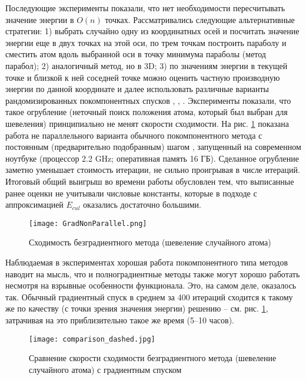   Последующие эксперименты показали, что нет необходимости пересчитывать значение энергии в ${O}\left( n \right)$ точках. Рассматривались следующие альтернативные стратегии: 1) выбрать случайно одну из координатных осей и посчитать значение энергии еще в двух точках на этой оси, по трем точкам построить параболу и сместить атом вдоль выбранной оси в точку минимума параболы (метод парабол); 2) аналогичный метод, но в 3D; 3) по значениям энергии в текущей точке и близкой к ней соседней точке можно оценить частную производную энергии по данной координате и далее использовать различные варианты рандомизированных покомпонентных спусков 
  \cite{conn2009introduction},
  \cite{ghadimi2013stochastic}, \cite{wright2015coordinate}.
  Эксперименты показали, что такое огрубление (неточный поиск положения атома, который был выбран для шевеления) принципиально не менят скорости сходимости. На рис. \ref{GF} показана работа не параллельного варианта обычного покомпонентного метода с постоянным (предварительно подобранным) шагом \cite{ghadimi2013stochastic}, запущенный на современном ноутбуке (процессор 2.2 GHz; оперативная память 16 ГБ). Сделанное огрубление заметно уменьшает стоимость итерации, не сильно проигрывая в числе итераций. Итоговый общий выигрыш во времени работы обусловлен тем, что выписанные ранее оценки не учитывали числовые константы, которые в подходе с аппроксимацией $E_{cul}$ оказались достаточно большими. 

  \begin{figure}
  \begin{center}
  \texttt{[image: GradNonParallel.png]}
  \end{center}
  \caption{Сходимость безградиентного метода (шевеление случайного атома)}
   \label{GF}
  \end{figure}

  Наблюдаемая в экспериментах хорошая работа покомпонентного типа методов наводит на мысль, что и полноградиентные методы также могут хорошо работать несмотря на взрывные особенности функционала. Это, на самом деле, оказалось так. Обычный градиентный спуск в среднем за 400 итераций сходится к такому же по качеству (с точки зрения значения энергии) решению -- см. рис. \ref{GF}, затрачивая на это приблизительно такое же время (5--10 часов). 


  \begin{figure}
  \begin{center}
  \texttt{[image: comparison\_dashed.jpg]}
  \end{center}
  \caption{Сравнение скорости сходимости безградиентного метода (шевеление случайного атома) с градиентным спуском}
   \label{Compare}
  \end{figure}

